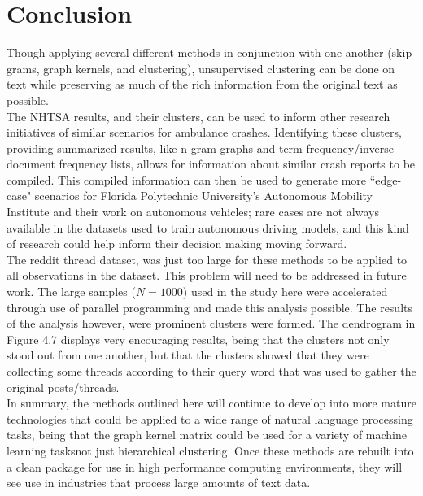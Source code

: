 %
%
%

\chapter{Conclusion}

Though applying several different methods in conjunction with one another (skip-grams, graph kernels, and clustering), unsupervised clustering can be done on text while preserving as much of the rich information from the original text as possible. \\
The NHTSA results, and their clusters, can be used to inform other research initiatives of similar scenarios for ambulance crashes. Identifying these clusters, providing summarized results, like n-gram graphs and term frequency/inverse document frequency lists, allows for information about similar crash reports to be compiled. This compiled information can then be used to generate more ``edge-case" scenarios for Florida Polytechnic University's Autonomous Mobility Institute and their work on autonomous vehicles; rare cases are not always available in the datasets used to train autonomous driving models, and this kind of research could help inform their decision making moving forward.\\
The reddit thread dataset, was just too large for these methods to be applied to all observations in the dataset. This problem will need to be addressed in future work. The large samples ($N=1000$) used in the study here were accelerated through use of parallel programming and made this analysis possible. The results of the analysis however, were prominent clusters were formed. The dendrogram in Figure 4.7 displays very encouraging results, being that the clusters not only stood out from one another, but that the clusters showed that they were collecting some threads according to their query word that was used to gather the original posts/threads. \\
In summary, the methods outlined here will continue to develop into more mature technologies that could be applied to a wide range of natural language processing tasks, being that the graph kernel matrix could be used for a variety of machine learning tasks\textemdash not just hierarchical clustering. Once these methods are rebuilt into a clean package for use in high performance computing environments, they will see use in industries that process large amounts of text data.\\
